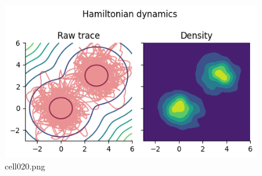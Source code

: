 \begin{figure}[ht]
	\centering
	\includegraphics[scale=0.8, max width=\linewidth]{./fig/bayesian-brain/mcmc/cell020.png}
	\caption{cell020.png}
	\label{cell020.png}
\end{figure}